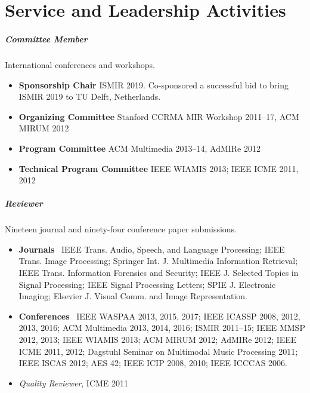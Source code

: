 \documentclass[10pt,letterpaper]{article}
\begin{document}





\section*{Service and Leadership Activities}

\subparagraph{Committee Member} International conferences and workshops.
\begin{itemize}
    \item \textbf{Sponsorship Chair} ISMIR 2019. Co-sponsored a successful bid to bring ISMIR 2019 to TU Delft, Netherlands.
    \item \textbf{Organizing Committee} Stanford CCRMA MIR Workshop 2011--17, ACM MIRUM 2012
    \item \textbf{Program Committee} ACM Multimedia 2013--14, AdMIRe 2012
    \item \textbf{Technical Program Committee} IEEE WIAMIS 2013; IEEE ICME 2011, 2012
\end{itemize}

\subparagraph{Reviewer} Nineteen journal and ninety-four conference paper submissions. 
\begin{itemize}
    \item \textbf{Journals} \ 
        IEEE Trans. Audio, Speech, and Language Processing;
        IEEE Trans. Image Processing; %
        Springer Int. J. Multimedia Information Retrieval; %
        IEEE Trans. Information Forensics and Security; %
        IEEE J. Selected Topics in Signal Processing; %
        IEEE Signal Processing Letters; %
        SPIE J. Electronic Imaging; %
        Elsevier J. Visual Comm. and Image Representation. %
    \item \textbf{Conferences} \ 
        IEEE WASPAA 2013, 2015, 2017; %
        IEEE ICASSP 2008, 2012, 2013, 2016; %
        ACM Multimedia 2013, 2014, 2016; %
        ISMIR 2011--15; %
        IEEE MMSP 2012, 2013; %
        IEEE WIAMIS 2013; %
        ACM MIRUM 2012; %
        AdMIRe 2012; %
        IEEE ICME 2011, 2012; %
        Dagstuhl Seminar on Multimodal Music Processing 2011; %
        IEEE ISCAS 2012; %
        AES 42; %
        IEEE ICIP 2008, 2010; %
        IEEE ICCCAS 2006. %
    \item \textit{Quality Reviewer}, ICME 2011
\end{itemize}
\end{document}
